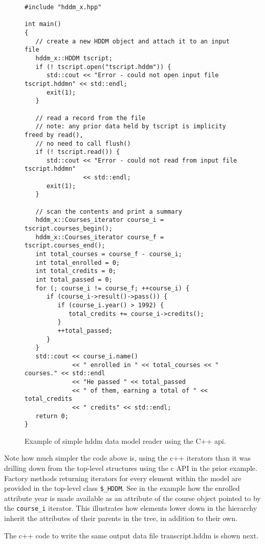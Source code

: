 \documentclass{revtex4}
\begin{document}
\begin{figure}
\begin{minipage}{12cm}
\begin{verbatim}
#include "hddm_x.hpp"

int main()
{
   // create a new HDDM object and attach it to an input file
   hddm_x::HDDM tscript;
   if (! tscript.open("tscript.hddm")) {
      std::cout << "Error - could not open input file tscript.hddmn" << std::endl;
      exit(1);
   }

   // read a record from the file
   // note: any prior data held by tscript is implicity freed by read(),
   // no need to call flush()
   if (! tscript.read()) {
      std::cout << "Error - could not read from input file tscript.hddmn"
                << std::endl;
      exit(1);
   }

   // scan the contents and print a summary
   hddm_x::Courses_iterator course_i = tscript.courses_begin();
   hddm_x::Courses_iterator course_f = tscript.courses_end();
   int total_courses = course_f - course_i;
   int total_enrolled = 0;
   int total_credits = 0;
   int total_passed = 0;
   for (; course_i != course_f; ++course_i) {
      if (course_i->result()->pass()) {
         if (course_i.year() > 1992) {
            total_credits += course_i->credits();
         }
         ++total_passed;
      }
   }
   std::cout << course_i.name()
             << " enrolled in " << total_courses << " courses." << std::endl
             << "He passed " << total_passed
             << " of them, earning a total of " << total_credits
             << " credits" << std::endl;
   return 0;
}
\end{verbatim}
\end{minipage}
\caption{\label{reader_ex2}
Example of simple hddm data model reader using the C++ api.
}
\end{figure}

Note how much simpler the code above is, using the c++ iterators than it was drilling down from 
the top-level structures using the c API in the prior example.  Factory methods returning iterators
for every element within the model are provided in the top-level class \texttt{\$\_HDDM}.
See in the example how the enrolled attribute year is made available as an attribute of the course
object pointed to by the \texttt{course\_i} iterator.  This illustrates how elements lower down
in the hierarchy inherit the attributes of their parents in the tree, in addition to their own.

The c++ code to write the same output data file transcript.hddm is shown next.
\end{document}
